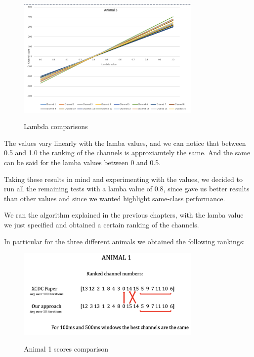 \documentclass{Configuration_Files/PoliMi3i_thesis}
\begin{document}
\begin{figure}[H]
    \centering
    \includegraphics[width=0.8\textwidth]{Results Matteo/figure1}
    \label{figure1}
    \caption{Lambda comparisons}
\end{figure}

The values vary linearly with the lamba values, and we can notice that between 0.5 and 1.0 the ranking of the channels is approxiamtely the same.
And the same can be said for the lamba values between 0 and 0.5.

Taking these results in mind and experimenting with the values, we decided to run all the remaining tests with a lamba value of 0.8, since gave us better results than other values and since we wanted highlight same-class performance.

We ran the algorithm explained in the previous chapters, with the lamba value we just specified and obtained a certain ranking of the channels.

In particular for the three different animals we obtained the following rankings:

\begin{figure}[H]
    \centering
    \includegraphics[width=0.8\textwidth]{Results Matteo/Screenshot 2024-08-18 at 18.54.22.png}
    \label{figure_ex1}
    \caption{Animal 1 scores comparison}
\end{figure}
\end{document}
